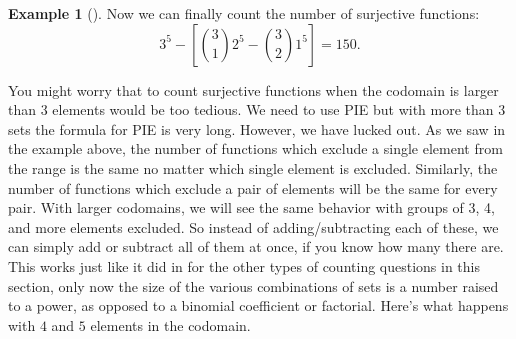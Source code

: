 \documentclass[10pt,]{book}
\theoremstyle{plain}
\theoremstyle{definition}
\newtheorem{example}[theorem]{Example}
\theoremstyle{definition}
\theoremstyle{definition}
\numberwithin{equation}{chapter}
\begin{document}
\begin{example}[]
    Now we can finally count the number of surjective functions:
    \begin{equation*}
      3^5 - \left[{3 \choose 1}2^5 - {3 \choose 2}1^5\right] = 150.
    \end{equation*}
\end{example}
\par

    You might worry that to count surjective functions when the codomain is larger than 3 elements would be too tedious. We need to use PIE but with more than 3 sets the formula for PIE is very long. However, we have lucked out. As we saw in the example above, the number of functions which exclude a single element from the range is the same no matter which single element is excluded. Similarly, the number of functions which exclude a pair of elements will be the same for every pair. With larger codomains,
    we will see the same behavior with groups of 3, 4, and more elements excluded. So instead of adding/subtracting each of these, we can simply add or subtract all of them at once, if you know how many there are. This works just like it did in for the other types of counting questions in this section, only now the size of the various combinations of sets is a number raised to a power, as opposed to a binomial coefficient or factorial. Here's what happens with \(4\) and \(5\) elements in the codomain.
\end{document}
